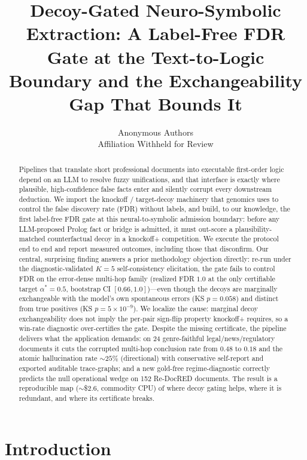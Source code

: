 \documentclass[11pt,letterpaper]{article}
\title{Decoy-Gated Neuro-Symbolic Extraction: A Label-Free FDR Gate at the Text-to-Logic Boundary and the Exchangeability Gap That Bounds It}
\author{Anonymous Authors\\ Affiliation Withheld for Review}
\date{}
\begin{document}
\maketitle

\begin{abstract}
Pipelines that translate short professional documents into executable first-order logic depend on an LLM to resolve fuzzy unifications, and that interface is exactly where plausible, high-confidence false facts enter and silently corrupt every downstream deduction. We import the knockoff / target-decoy machinery that genomics uses to control the false discovery rate (FDR) without labels, and build, to our knowledge, the first label-free FDR gate at this neural-to-symbolic admission boundary: before any LLM-proposed Prolog fact or bridge is admitted, it must out-score a plausibility-matched counterfactual decoy in a knockoff+ competition. We execute the protocol end to end and report measured outcomes, including those that disconfirm. Our central, surprising finding answers a prior methodology objection directly: re-run under the diagnostic-validated $K{=}5$ self-consistency elicitation, the gate fails to control FDR on the error-dense multi-hop family (realized FDR $1.0$ at the only certifiable target $\alpha^{*}{=}0.5$, bootstrap CI $[0.66,1.0]$)---even though the decoys are marginally exchangeable with the model's own spontaneous errors (KS $p{=}0.058$) and distinct from true positives (KS $p{=}5\times10^{-9}$). We localize the cause: marginal decoy exchangeability does not imply the per-pair sign-flip property knockoff+ requires, so a win-rate diagnostic over-certifies the gate. Despite the missing certificate, the pipeline delivers what the application demands: on 24 genre-faithful legal/news/regulatory documents it cuts the corrupted multi-hop conclusion rate from $0.48$ to $0.18$ and the atomic hallucination rate $\sim 25\%$ (directional) with conservative self-report and exported auditable trace-graphs; and a new gold-free regime-diagnostic correctly predicts the null operational wedge on 152 Re-DocRED documents. The result is a reproducible map ($\sim$\$2.6, commodity CPU) of where decoy gating helps, where it is redundant, and where its certificate breaks.
\end{abstract}

\section{Introduction}
\end{document}
